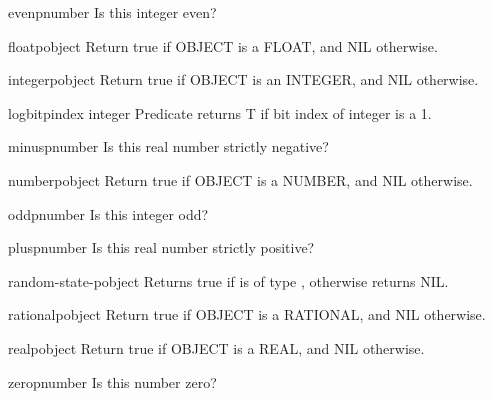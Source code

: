\documentclass[10pt,english]{book}
\begin{document}
\begin{function}{evenp}{number}
  Is this integer even?
\end{function}

\begin{function}{floatp}{object}
  Return true if OBJECT is a FLOAT, and NIL otherwise.
\end{function}

\begin{function}{integerp}{object}
  Return true if OBJECT is an INTEGER, and NIL otherwise.
\end{function}

\begin{function}{logbitp}{index integer}
  Predicate returns T if bit index of integer is a 1.
\end{function}

\begin{function}{minusp}{number}
  Is this real number strictly negative?
\end{function}

\begin{function}{numberp}{object}
  Return true if OBJECT is a NUMBER, and NIL otherwise.
\end{function}

\begin{function}{oddp}{number}
  Is this integer odd?
\end{function}

\begin{function}{plusp}{number}
  Is this real number strictly positive?
\end{function}

\begin{function}{random-state-p}{object}
  Returns true if  is of type ,
  otherwise returns NIL.
\end{function}

\begin{function}{rationalp}{object}
  Return true if OBJECT is a RATIONAL, and NIL otherwise.
\end{function}

\begin{function}{realp}{object}
  Return true if OBJECT is a REAL, and NIL otherwise.
\end{function}

\begin{function}{zerop}{number}
  Is this number zero?
\end{function}
\end{document}
